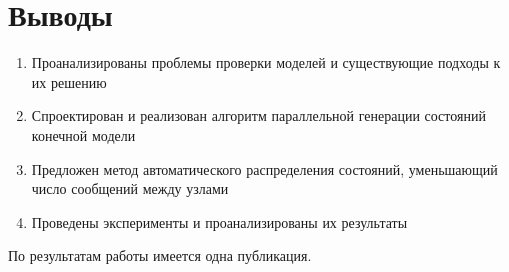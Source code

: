 \documentclass[12pt]{article}
\begin{document}
\section{Выводы}
\label{sec:conclusion}

\small
\begin{enumerate}
\item Проанализированы проблемы проверки моделей и существующие подходы к их решению
\item Спроектирован и реализован алгоритм параллельной генерации состояний конечной
  модели
\item Предложен метод автоматического распределения состояний, уменьшающий число сообщений
  между узлами
\item Проведены эксперименты и проанализированы их результаты
\end{enumerate}

По результатам работы имеется одна публикация.
\end{document}
